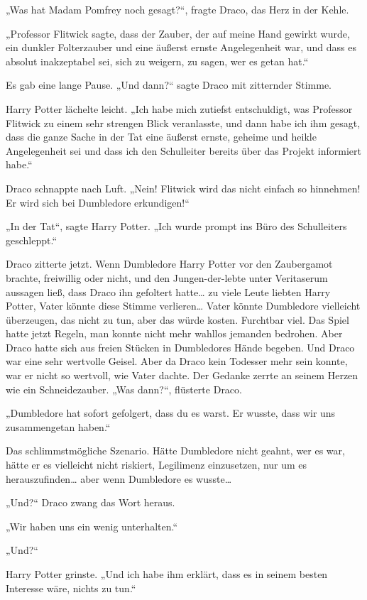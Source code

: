 {„Was hat Madam Pomfrey noch gesagt?“, fragte Draco, das Herz in der Kehle.

„Professor Flitwick sagte, dass der Zauber, der auf meine Hand gewirkt wurde, ein dunkler Folterzauber und eine äußerst ernste Angelegenheit war, und dass es absolut inakzeptabel sei, sich zu weigern, zu sagen, wer es getan hat.“

Es gab eine lange Pause. „Und dann?“ sagte Draco mit zitternder Stimme.

Harry Potter lächelte leicht. „Ich habe mich zutiefst entschuldigt, was Professor Flitwick zu einem sehr strengen Blick veranlasste, und dann habe ich ihm gesagt, dass die ganze Sache in der Tat eine äußerst ernste, geheime und heikle Angelegenheit sei und dass ich den Schulleiter bereits über das Projekt informiert habe.“

Draco schnappte nach Luft. „Nein! Flitwick wird das nicht einfach so hinnehmen! Er wird sich bei Dumbledore erkundigen!“

„In der Tat“, sagte Harry Potter. „Ich wurde prompt ins Büro des Schulleiters geschleppt.“

Draco zitterte jetzt. Wenn Dumbledore Harry Potter vor den Zaubergamot brachte, freiwillig oder nicht, und den Jungen-der-lebte unter Veritaserum aussagen ließ, dass Draco ihn gefoltert hatte… zu viele Leute liebten Harry Potter, Vater könnte diese Stimme verlieren… Vater könnte Dumbledore vielleicht überzeugen, das nicht zu tun, aber das würde kosten. Furchtbar viel. Das Spiel hatte jetzt Regeln, man konnte nicht mehr wahllos jemanden bedrohen. Aber Draco hatte sich aus freien Stücken in Dumbledores Hände begeben. Und Draco war eine sehr wertvolle Geisel. Aber da Draco kein Todesser mehr sein konnte, war er nicht so wertvoll, wie Vater dachte. Der Gedanke zerrte an seinem Herzen wie ein Schneidezauber. „Was dann?“, flüsterte Draco.

„Dumbledore hat sofort gefolgert, dass du es warst. Er wusste, dass wir uns zusammengetan haben.“

Das schlimmstmögliche Szenario. Hätte Dumbledore nicht geahnt, wer es war, hätte er es vielleicht nicht riskiert, Legilimenz einzusetzen, nur um es herauszufinden… aber wenn Dumbledore es wusste…

„Und?“ Draco zwang das Wort heraus.

„Wir haben uns ein wenig unterhalten.“

„Und?“

Harry Potter grinste. „Und ich habe ihm erklärt, dass es in seinem besten Interesse wäre, nichts zu tun.“

}

